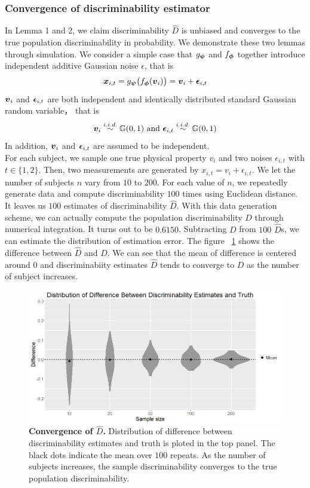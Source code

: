 \documentclass{article}
\begin{document}
\subsubsection{Convergence of discriminability estimator}
In Lemma 1 and 2, we claim discriminability $\hat{D}$ is unbiased and converges to  the true population discriminability in probability. We demonstrate these two lemmas through simulation. We consider a simple case that $g_{\boldsymbol{\psi}}$ and $f_{\boldsymbol{\phi}}$ together introduce independent additive Gaussian noise $\epsilon$, that is
\begin{equation}
\boldsymbol{x}_{i,t} =g_{\boldsymbol{\psi}} \big(f_{\boldsymbol{\phi}} (\boldsymbol{v}_i) \big) =\boldsymbol{v}_{i} + \boldsymbol{\epsilon}_{i,t}
\end{equation}  
$\boldsymbol{v}_{i}$ and $\boldsymbol{\epsilon}_{i,t}$ are both independent and identically distributed standard Gaussian random variable， that is 
\[\boldsymbol{v}_i \overset{i.i.d.}{\sim} \mathbb{G}(0,1) \text{ and  }\boldsymbol{\epsilon}_{i,t} \overset{i.i.d.}{\sim} \mathbb{G}(0,1)\] 
In addition, $\boldsymbol{v}_{i}$ and $\boldsymbol{\epsilon}_{i,t}$ are assumed to be independent. \\
For each subject, we sample one true physical property $v_i$ and two noises $\epsilon_{i,t}$ with $t\in\{1,2\}$. Then, two measurements are generated by $x_{i,t} = v_{i} + \epsilon_{i,t}$. We let the number of subjects $n$ vary from $10$ to $200$. For each value of $n$, we repeatedly generate data and compute discriminability $100$ times using Euclidean distance. It leaves us $100$ estimates of discriminability $\hat{D}$. With this data generation scheme, we can actually compute the population discriminability $D$ through numerical integration. It turns out to be $0.6150$. Subtracting $D$ from $100$ $\hat{D}$s, we can estimate the distribution of estimation error. The figure ~\ref{fig:simu1} shows the difference between $\hat{D}$ and $D$. We can see that the mean of difference is centered around 0 and  discriminabiity estimates $\hat{D}$ tends to converge to $D$ as the number of subject increases.
\newpage
\begin{figure}[ht!]
	\includegraphics[width=\linewidth]{../Figs/simu1.png}
	\caption{{\bf Convergence of $\hat{D}$.} Distribution of difference between discriminability estimates and truth is ploted in the top panel. The black dots indicate the mean over $100$ repeats. As the number of subjects increases, the sample discriminability converges to the true population discriminability.}
	\label{fig:simu1}
\end{figure}
\end{document}
